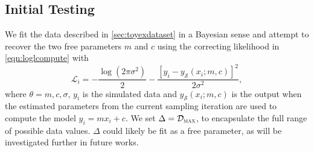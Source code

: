 \documentclass[fleqn,usenatbib]{mnras}
\begin{document}
\subsection{Initial Testing}\label{sec:initialsetup}
We fit the data described in \cref{sec:toyexdataset} in a Bayesian sense and attempt to recover the two free parameters $m$ and $c$ using the correcting likelihood in \cref{eqn:loglcompute} with
\begin{equation}
\mathcal{L}_i = -\frac{\log(2\pi \sigma^{2})}{2} - \frac{[y_{i} - y_{\mathcal{S}}(x_i;m, c)]^2}{2\sigma^2},
\end{equation}
where $\theta = m, c, \sigma$, $y_i$ is the simulated data and $y_\mathcal{S}(x_i; m, c)$ is the output when the estimated parameters from the current sampling iteration are used to compute the model $y_i=mx_i + c$. We set $\Delta = \mathcal{D}_\textsc{max}$, to encapsulate the full range of possible data values. $\Delta$ could likely be fit as a free parameter, as will be investigated further in future works.
\end{document}
